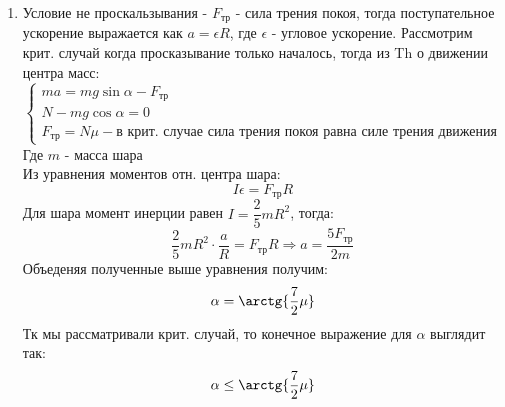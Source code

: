 \documentclass[a4paper]{article}
\begin{document}
\begin{enumerate}
	\item Условие не проскальзывания - $F_{\text{тр}}$ - сила трения покоя, тогда поступательное ускорение выражается как $a=\epsilon R$, где $\epsilon$ - угловое ускорение. Рассмотрим крит. случай когда просказывание только началось, тогда из Th о движении центра масс: 
		\begin{equation*}
			\begin{cases}
			ma=mg\sin\alpha-F_{\text{тр}}\\
			N-mg\cos\alpha=0\\
			F_{\text{тр}}=N\mu - \text{в крит. случае сила трения покоя равна силе трения движения}
			\end{cases}
		\end{equation*}
		Где $m$ - масса шара\\
		Из уравнения моментов отн. центра шара:
		\begin{equation*}
			I\epsilon=F_{\text{тр}}R
		\end{equation*}
		Для шара момент инерции равен $I=\dfrac{2}{5}m R^2$, тогда:
		\begin{equation*}
			\dfrac{2}{5}m R^2\cdot \dfrac{a}{R}=F_{\text{тр}}R \Rightarrow
			a = \dfrac{5F_{\text{тр}}}{2m}
		\end{equation*}
		Объеденяя полученные выше уравнения получим:
		\begin{equation*}
			\alpha=\arctg{\dfrac{7}{2}\mu}
		\end{equation*}
		Тк мы рассматривали крит. случай, то конечное выражение для $\alpha$ выглядит так:
		\begin{equation*}
			\alpha \leq \arctg{\dfrac{7}{2}\mu}
		\end{equation*}


\end{enumerate}
\end{document}
